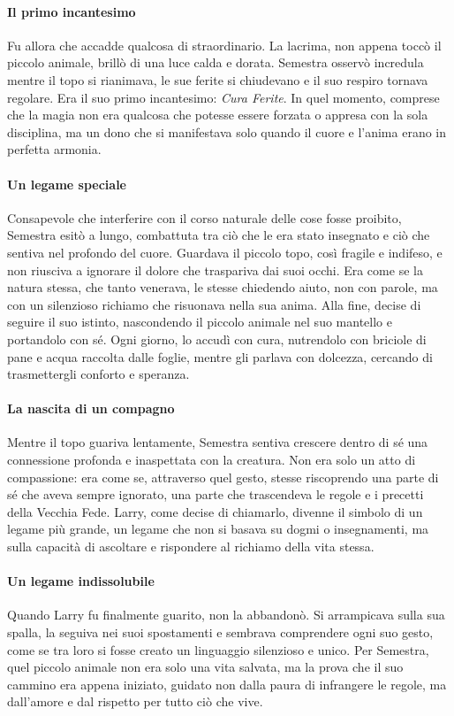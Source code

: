\documentclass[letterpaper,twocolumn,openany,nodeprecatedcode]{dndbook}
\begin{document}
\paragraph{Il primo incantesimo}  
Fu allora che accadde qualcosa di straordinario. La lacrima, non appena toccò il piccolo animale, brillò di una luce calda e dorata. Semestra osservò incredula mentre il topo si rianimava, le sue ferite si chiudevano e il suo respiro tornava regolare. Era il suo primo incantesimo: \textit{Cura Ferite}. In quel momento, comprese che la magia non era qualcosa che potesse essere forzata o appresa con la sola disciplina, ma un dono che si manifestava solo quando il cuore e l’anima erano in perfetta armonia.

\paragraph{Un legame speciale}  
Consapevole che interferire con il corso naturale delle cose fosse proibito, Semestra esitò a lungo, combattuta tra ciò che le era stato insegnato e ciò che sentiva nel profondo del cuore. Guardava il piccolo topo, così fragile e indifeso, e non riusciva a ignorare il dolore che traspariva dai suoi occhi. Era come se la natura stessa, che tanto venerava, le stesse chiedendo aiuto, non con parole, ma con un silenzioso richiamo che risuonava nella sua anima. Alla fine, decise di seguire il suo istinto, nascondendo il piccolo animale nel suo mantello e portandolo con sé. Ogni giorno, lo accudì con cura, nutrendolo con briciole di pane e acqua raccolta dalle foglie, mentre gli parlava con dolcezza, cercando di trasmettergli conforto e speranza.

\paragraph{La nascita di un compagno}  
Mentre il topo guariva lentamente, Semestra sentiva crescere dentro di sé una connessione profonda e inaspettata con la creatura. Non era solo un atto di compassione: era come se, attraverso quel gesto, stesse riscoprendo una parte di sé che aveva sempre ignorato, una parte che trascendeva le regole e i precetti della Vecchia Fede. Larry, come decise di chiamarlo, divenne il simbolo di un legame più grande, un legame che non si basava su dogmi o insegnamenti, ma sulla capacità di ascoltare e rispondere al richiamo della vita stessa.

\paragraph{Un legame indissolubile}  
Quando Larry fu finalmente guarito, non la abbandonò. Si arrampicava sulla sua spalla, la seguiva nei suoi spostamenti e sembrava comprendere ogni suo gesto, come se tra loro si fosse creato un linguaggio silenzioso e unico. Per Semestra, quel piccolo animale non era solo una vita salvata, ma la prova che il suo cammino era appena iniziato, guidato non dalla paura di infrangere le regole, ma dall’amore e dal rispetto per tutto ciò che vive.
\end{document}
